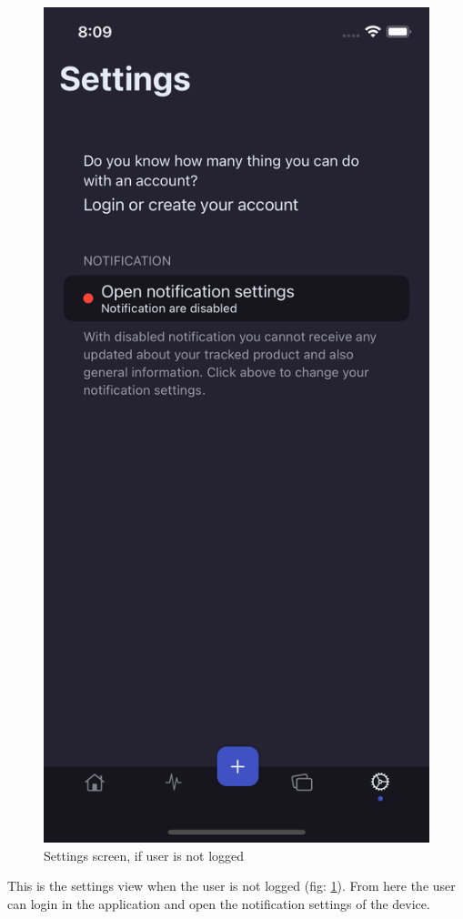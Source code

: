 \begin{figure}[h!]
        \centering
        \includegraphics[scale=0.15]{images/interfaces/settings_screen_not_logged.png}
        \caption{Settings screen, if user is not logged}
        \label{fig:settings_screen_not_logged}
\end{figure}
\FloatBarrier
This is the settings view when the user is not logged (fig: \ref{fig:settings_screen_not_logged}). From here the user can login in the application and open the notification settings of the device.

